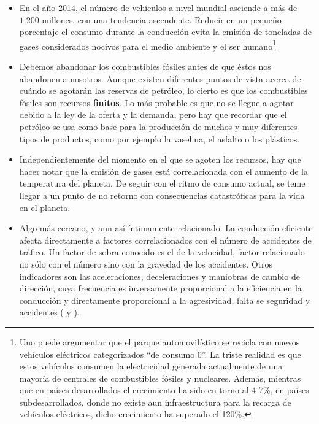 \begin{itemize}
	\item En el año 2014, el número de vehículos a nivel mundial asciende a más de $1.200$ millones\cite{oica2014motrate}, con una tendencia ascendente. Reducir en un pequeño porcentaje el consumo durante la conducción evita la emisión de toneladas de gases considerados nocivos para el medio ambiente y el ser humano\footnote{Uno puede argumentar que el parque automovilístico se recicla con nuevos vehículos eléctricos categorizados \enquote{de consumo 0}. La triste realidad es que estos vehículos consumen la electricidad generada actualmente de una mayoría de centrales de combustibles fósiles y nucleares. Además, mientras que en países desarrollados el crecimiento ha sido en torno al 4-7\%, en países subdesarrollados, donde no existe aun infraestructura para la recarga de vehículos eléctricos, dicho crecimiento ha superado el 120\%.}
	\item Debemos abandonar los combustibles fósiles antes de que éstos nos abandonen a nosotros. Aunque existen diferentes puntos de vista acerca de cuándo se agotarán las reservas de petróleo, lo cierto es que los combustibles fósiles son recursos \textbf{finitos}. Lo más probable es que no se llegue a agotar debido a la ley de la oferta y la demanda, pero hay que recordar que el petróleo se usa como base para la producción de muchos y muy diferentes tipos de productos, como por ejemplo la vaselina, el asfalto o los plásticos.
	\item Independientemente del momento en el que se agoten los recursos, hay que hacer notar que la emisión de gases está correlacionada con el aumento de la temperatura del planeta. De seguir con el ritmo de consumo actual, se teme llegar a un punto de no retorno con consecuencias catastróficas para la vida en el planeta.
	\item Algo más cercano, y aun así íntimamente relacionado. La conducción eficiente afecta directamente a factores correlacionados con el número de accidentes de tráfico. Un factor de sobra conocido es el de la velocidad, factor relacionado no sólo con el número sino con la gravedad de los accidentes\cite{imprialou2016re}. Otros indicadores son las aceleraciones, deceleraciones y maniobras de cambio de dirección, cuya frecuencia es inversamente proporcional a la eficiencia en la conducción y directamente proporcional a la agresividad, falta se seguridad y accidentes (\cite{dingus2006100} y \cite{lerner2010exploration}).
\end{itemize}

